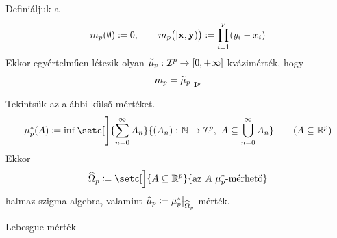 \documentclass[
]{elteikthesis}[2024/04/26]
\begin{document}
	\begin{theorem}{}{}
		Definiáljuk a
		\[
			m_p( \emptyset ) \coloneq 0, \qquad
			m_p \bigl( [\vb{x}, \vb{y}) \bigr) \coloneq \prod_{i=1}^{p} (y_i - x_i)
		\]
		Ekkor egyértelműen létezik olyan 
		\( \widetilde{\mu}_p  \,\colon \mathcal{I}^p \to [0, +\infty] \) kvázimérték, hogy
		\[
			m_p = \restr{ \widetilde{\mu}_p }{ \mathbf{I}^p }
		\]
	\end{theorem}
	
	\begin{theorem}{}{}
		Tekintsük az alábbi külső mértéket.
		\[
			\mu_p^*( A ) \coloneq
			\inf \setc[\Bigg]{ \sum_{n=0}^{\infty} A_n }
			                 { \func{(A_n)}{\N}{\mathcal{I}^p}, \ A \subseteq \bigcup_{n=0}^{\infty} A_n }
			\qquad (A \subseteq \R^p)
		\]
		Ekkor
		\[
			\widehat{\Omega}_p \coloneq
			\setc[\Big]{ A \subseteq \R^p }
			           { \text{az } A \ \mu_p^* \text{-mérhető} }
		\]
		halmaz szigma-algebra, 
		valamint \( \widehat{ \mu }_p \coloneq \restr{ \mu_p^* }{ \widehat{\Omega}_p } \) mérték.
	\end{theorem}
	
	\begin{definition}{Lebesgue-mérték}{}
		
	\end{definition}
	
\end{document}
